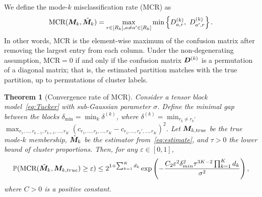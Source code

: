 \documentclass[11pt]{article}
\theoremstyle{plain}
\newtheorem{theorem}{Theorem}
\theoremstyle{definition}
\begin{document}
We define the mode-$k$ misclassification rate (MCR) as
\begin{equation} \label{eq:MCR}
\text{MCR}(\bm M_k,\hat{\bm M}_k) = \max_{r\in [R_k], a\neq a'\in [R_k]}\min\left\{ D^{(k)}_{a,r},\ D^{(k)}_{a',r}\right\}.
\end{equation}
In other words, MCR is the element-wise maximum of the confusion matrix after removing the largest entry from each column. Under the non-degenerating assumption, $\text{MCR}=0$ if and only if the confusion matrix $\bm{D}^{(k)}$ is a permutation of a diagonal matrix; that is, the estimated partition matches with the true partition, up to permutations of cluster labels. 



\begin{theorem}[Convergence rate of MCR] \label{thm:mcr}
Consider a tensor block model~\eqref{eq:Tucker} with sub-Gaussian parameter $\sigma$. Define the minimal gap between the blocks $\delta_{\min}=\min_k\delta^{(k)}$, where $\delta^{(k)}=\min_{r_k\neq r_k'}$ $\max_{r_1,\ldots,r_{k-1},r_{k+1},\ldots,r_K}(c_{r_1,\ldots,r_k,\ldots,r_K}-c_{r_1,\ldots,r_k',\ldots,r_K})^2$. Let $\bm M_{k,\text{true}}$ be the true mode-$k$ membership, $\hat {\bm M}_k$ be the estimator from~\eqref{eq:estimate}, and $\tau>0$ the lower bound of cluster proportions. Then, for any $\varepsilon\in[0,1]$,
		\begin{equation} \label{eq:mcrbound}
	\mathbb{P}(\text{MCR}(\hat{\bm M}_k, \bm M_{k,true})\geq \varepsilon) \leq  2^{1+\sum_{k=1}^Kd_k}\exp \left(-\frac{C_2\varepsilon^2\delta_{min}^2\tau^{3K-2}\prod_{k=1}^Kd_k}{\sigma^2}\right),
	\end{equation}
where $C>0$ is a positive constant.
\end{theorem}
\end{document}
